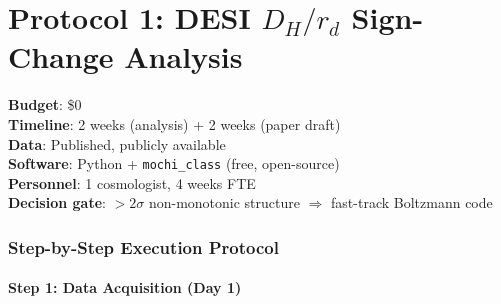 \documentclass[11pt]{article}
\begin{document}
\tableofcontents
\newpage


\part{Protocol 1: DESI $D_H/r_d$ Sign-Change Analysis}
\label{part:desi}

\begin{tcolorbox}[colback=green!3!white, colframe=actioncolor,
  title=\textbf{PROTOCOL 1: DESI $D_H/r_d$ --- READY TO EXECUTE}]
\textbf{Budget}: \$0\\
\textbf{Timeline}: 2 weeks (analysis) + 2 weeks (paper draft)\\
\textbf{Data}: Published, publicly available\\
\textbf{Software}: Python + \texttt{mochi\_class} (free, open-source)\\
\textbf{Personnel}: 1 cosmologist, 4 weeks FTE\\
\textbf{Decision gate}: $>2\sigma$ non-monotonic structure $\Rightarrow$ fast-track Boltzmann code
\end{tcolorbox}


\section{Step-by-Step Execution Protocol}

\subsection{Step 1: Data Acquisition (Day 1)}
\end{document}
